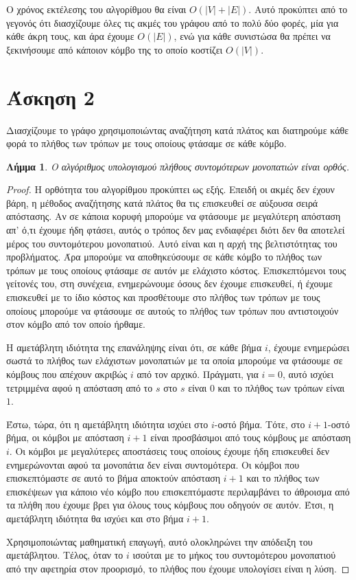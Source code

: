 \documentclass[11pt,a4paper,oneside]{report}
\newtheorem*{lemma}{Λήμμα}
\begin{document}
Ο χρόνος εκτέλεσης του αλγορίθμου θα είναι $O( |V| + |E| )$. Αυτό προκύπτει από το γεγονός ότι διασχίζουμε όλες τις ακμές του γράφου από το πολύ δύο φορές, μία για κάθε άκρη τους, και άρα έχουμε $O( |E| )$, ενώ για κάθε συνιστώσα θα πρέπει να ξεκινήσουμε από κάποιον κόμβο της το οποίο κοστίζει $O( |V| )$.

\section*{Άσκηση 2}
Διασχίζουμε το γράφο χρησιμοποιώντας αναζήτηση κατά πλάτος και διατηρούμε κάθε φορά το πλήθος των τρόπων με τους οποίους φτάσαμε σε κάθε κόμβο.

\begin{lemma}
Ο αλγόριθμος υπολογισμού πλήθους συντομότερων μονοπατιών είναι ορθός.
\end{lemma}
\begin{proof}
Η ορθότητα του αλγορίθμου προκύπτει ως εξής. Επειδή οι ακμές δεν έχουν βάρη, η μέθοδος αναζήτησης κατά πλάτος θα τις επισκευθεί σε αύξουσα σειρά απόστασης. Αν σε κάποια κορυφή μπορούμε να φτάσουμε με μεγαλύτερη απόσταση απ' ό,τι έχουμε ήδη φτάσει, αυτός ο τρόπος δεν μας ενδιαφέρει διότι δεν θα αποτελεί μέρος του συντομότερου μονοπατιού. Αυτό είναι και η αρχή της βελτιστότητας του προβλήματος. Άρα μπορούμε να αποθηκεύσουμε σε κάθε κόμβο το πλήθος των τρόπων με τους οποίους φτάσαμε σε αυτόν με ελάχιστο κόστος. Επισκεπτόμενοι τους γείτονές του, στη συνέχεια, ενημερώνουμε όσους δεν έχουμε επισκευθεί, ή έχουμε επισκευθεί με το ίδιο κόστος και προσθέτουμε στο πλήθος των τρόπων με τους οποίους μπορούμε να φτάσουμε σε αυτούς το πλήθος των τρόπων που αντιστοιχούν στον κόμβο από τον οποίο ήρθαμε.

Η αμετάβλητη ιδιότητα της επανάληψης είναι ότι, σε κάθε βήμα $i$, έχουμε ενημερώσει σωστά το πλήθος των ελάχιστων μονοπατιών με τα οποία μπορούμε να φτάσουμε σε κόμβους που απέχουν ακριβώς $i$ από τον αρχικό. Πράγματι, για $i = 0$, αυτό ισχύει τετριμμένα αφού η απόσταση από το $s$ στο $s$ είναι 0 και το πλήθος των τρόπων είναι $1$.

Έστω, τώρα, ότι η αμετάβλητη ιδιότητα ισχύει στο $i$-οστό βήμα. Τότε, στο $i + 1$-οστό βήμα, οι κόμβοι με απόσταση $i + 1$ είναι προσβάσιμοι από τους κόμβους με απόσταση $i$. Οι κόμβοι με μεγαλύτερες αποστάσεις τους οποίους έχουμε ήδη επισκευθεί δεν ενημερώνονται αφού τα μονοπάτια δεν είναι συντομότερα. Οι κόμβοι που επισκεπτόμαστε σε αυτό το βήμα αποκτούν απόσταση $i + 1$ και το πλήθος των επισκέψεων για κάποιο νέο κόμβο που επισκεπτόμαστε περιλαμβάνει το άθροισμα από τα πλήθη που έχουμε βρει για όλους τους κόμβους που οδηγούν σε αυτόν. Έτσι, η αμετάβλητη ιδιότητα θα ισχύει και στο βήμα $i + 1$.

Χρησιμοποιώντας μαθηματική επαγωγή, αυτό ολοκληρώνει την απόδειξη του αμετάβλητου. Τέλος, όταν το $i$ ισούται με το μήκος του συντομότερου μονοπατιού από την αφετηρία στον προορισμό, το πλήθος που έχουμε υπολογίσει είναι η λύση.
\end{proof}
\end{document}
